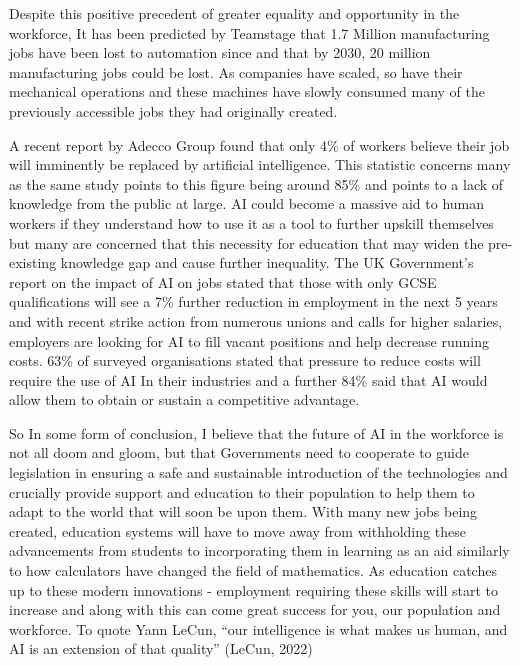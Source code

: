 Despite this positive precedent of greater equality and opportunity in the workforce, It has been predicted by Teamstage that 1.7 Million manufacturing jobs have been lost to automation since and that by 2030, 20 million manufacturing jobs could be lost. As companies have scaled, so have their mechanical operations and these machines have slowly consumed many of the previously accessible jobs they had originally created.

A recent report by Adecco Group found that only 4\% of workers believe their job will imminently be replaced by artificial intelligence. This statistic concerns many as the same study points to this figure being around 85\% and points to a lack of knowledge from the public at large. AI could become a massive aid to human workers if they understand how to use it as a tool to further upskill themselves but many are concerned that this necessity for education that may widen the pre-existing knowledge gap and cause further inequality. The UK Government's report on the impact of AI on jobs stated that those with only GCSE qualifications will see a 7\% further reduction in employment in the next 5 years and with recent strike action from numerous unions and calls for higher salaries, employers are looking for AI to fill vacant positions and help decrease running costs. 63\% of surveyed organisations stated that pressure to reduce costs will require the use of AI In their industries and a further 84\% said that AI would allow them to obtain or sustain a competitive advantage.

So In some form of conclusion, I believe that the future of AI in the workforce is not all doom and gloom, but that Governments need to cooperate to guide legislation in ensuring a safe and sustainable introduction of the technologies and crucially provide support and education to their population to help them to adapt to the world that will soon be upon them. With many new jobs being created, education systems will have to move away from withholding these advancements from students to incorporating them in learning as an aid similarly to how calculators have changed the field of mathematics. As education catches up to these modern innovations - employment requiring these skills will start to increase and along with this can come great success for you, our population and workforce. To quote Yann LeCun, “our intelligence is what makes us human, and AI is an extension of that quality” (LeCun, 2022)

\fussy
